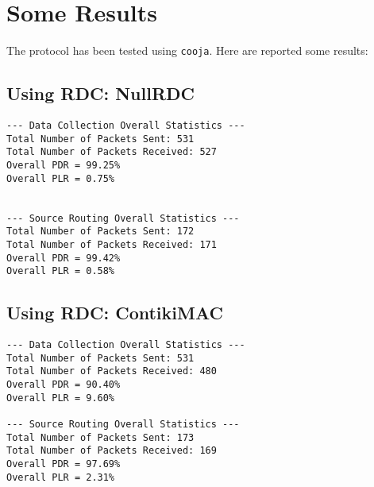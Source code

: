 \section{Some Results}
\label{sec:some_results}

The protocol has been tested using \texttt{cooja}. Here are reported some results:

\subsection{Using RDC: NullRDC}

\begin{lstlisting} 
--- Data Collection Overall Statistics ---
Total Number of Packets Sent: 531
Total Number of Packets Received: 527
Overall PDR = 99.25%
Overall PLR = 0.75%


--- Source Routing Overall Statistics ---
Total Number of Packets Sent: 172
Total Number of Packets Received: 171
Overall PDR = 99.42%
Overall PLR = 0.58%
\end{lstlisting}


\subsection{Using RDC: ContikiMAC}

\begin{lstlisting} 
--- Data Collection Overall Statistics ---
Total Number of Packets Sent: 531
Total Number of Packets Received: 480
Overall PDR = 90.40%
Overall PLR = 9.60%

--- Source Routing Overall Statistics ---
Total Number of Packets Sent: 173
Total Number of Packets Received: 169
Overall PDR = 97.69%
Overall PLR = 2.31%
\end{lstlisting}
